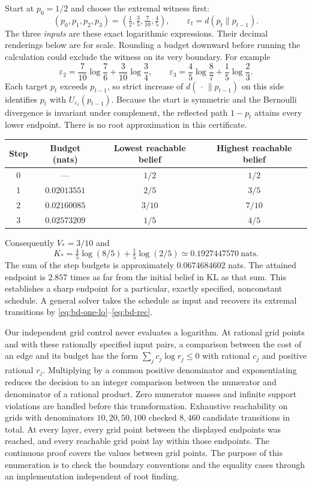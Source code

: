 \documentclass[12pt,letterpaper]{article}
\begin{document}
Start at $p_0=1/2$ and choose the extremal witness first:
\[
 (p_0,p_1,p_2,p_3)=\left(\tfrac12,\tfrac35,\tfrac7{10},\tfrac45\right),
 \qquad \varepsilon_t=d(p_t\|p_{t-1}).
\]
The three \emph{inputs} are these exact logarithmic expressions. Their decimal renderings below are for scale. Rounding a budget downward before running the calculation could exclude the witness on its very boundary. For example
\[
 \varepsilon_2=\frac7{10}\log\frac76+\frac3{10}\log\frac34,\qquad
 \varepsilon_3=\frac45\log\frac87+\frac15\log\frac23.
\]
Each target $p_t$ exceeds $p_{t-1}$, so strict increase of $d(\,\cdot\,\|p_{t-1})$ on this side identifies $p_t$ with $U_{\varepsilon_t}(p_{t-1})$. Because the start is symmetric and the Bernoulli divergence is invariant under complement, the reflected path $1-p_t$ attains every lower endpoint. There is no root approximation in this certificate.
\begin{center}
\begin{tabular}{c c c c}
\hline
Step & Budget (nats) & Lowest reachable belief & Highest reachable belief\\
\hline
0 & --- & $1/2$ & $1/2$\\
1 & $0.02013551$ & $2/5$ & $3/5$\\
2 & $0.02160085$ & $3/10$ & $7/10$\\
3 & $0.02573209$ & $1/5$ & $4/5$\\
\hline
\end{tabular}
\end{center}
Consequently $V_*=3/10$ and
\[
 K_*=\tfrac45\log(8/5)+\tfrac15\log(2/5)
      \simeq 0.1927447570\ \text{nats}.
\]
The sum of the step budgets is approximately $0.0674684602$ nats. The attained endpoint is $2.857$ times as far from the initial belief in KL as that sum. This establishes a sharp endpoint for a particular, exactly specified, nonconstant schedule. A general solver takes the schedule as input and recovers its extremal transitions by \eqref{eq:bd-one-lo}--\eqref{eq:bd-rec}.

Our independent grid control never evaluates a logarithm. At rational grid points and with these rationally specified input pairs, a comparison between the cost of an edge and its budget has the form $\sum_j c_j\log r_j\leq 0$ with rational $c_j$ and positive rational $r_j$. Multiplying by a common positive denominator and exponentiating reduces the decision to an integer comparison between the numerator and denominator of a rational product. Zero numerator masses and infinite support violations are handled before this transformation. Exhaustive reachability on grids with denominators $10,20,50,100$ checked $8{,}460$ candidate transitions in total. At every layer, every grid point between the displayed endpoints was reached, and every reachable grid point lay within those endpoints. The continuous proof covers the values between grid points. The purpose of this enumeration is to check the boundary conventions and the equality cases through an implementation independent of root finding.
\end{document}
